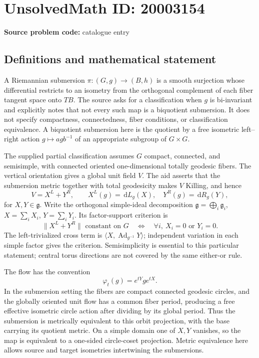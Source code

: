 \documentclass[11pt]{article}
\newcommand{\dd}{\,\mathrm{d}}
\begin{document}
\section*{UnsolvedMath ID: 20003154}
\textbf{Source problem code:} catalogue entry
\subsection{Definitions and mathematical statement}
A Riemannian submersion $\pi:(G,g)\to(B,h)$ is a smooth surjection whose differential restricts to an isometry from the orthogonal complement of each fiber tangent space onto $TB$. The source asks for a classification when $g$ is bi-invariant and explicitly notes that not every such map is a biquotient submersion. It does not specify compactness, connectedness, fiber conditions, or classification equivalence. A biquotient submersion here is the quotient by a free isometric left--right action $g\mapsto agb^{-1}$ of an appropriate subgroup of $G\times G$.

The supplied partial classification assumes $G$ compact, connected, and semisimple, with connected oriented one-dimensional totally geodesic fibers. The vertical orientation gives a global unit field $V$. The aid asserts that the submersion metric together with total geodesicity makes $V$ Killing, and hence
\[
V=X^L+Y^R,\qquad X^L(g)=\dd L_g(X),\quad Y^R(g)=\dd R_g(Y),
\]
for $X,Y\in\mathfrak g$. Write the orthogonal simple-ideal decomposition $\mathfrak g=\bigoplus_i\mathfrak g_i$, $X=\sum_iX_i$, $Y=\sum_iY_i$. Its factor-support criterion is
\[
\|X^L+Y^R\|\text{ constant on }G
\quad\Longleftrightarrow\quad
\forall i,\ X_i=0\text{ or }Y_i=0.
\]
The left-trivialized cross term is $\langle X,\operatorname{Ad}_{g^{-1}}Y\rangle$; independent variation in each simple factor gives the criterion. Semisimplicity is essential to this particular statement; central torus directions are not covered by the same either-or rule.

The flow has the convention
\[
\varphi_t(g)=e^{tY}ge^{tX}.
\]
In the submersion setting the fibers are compact connected geodesic circles, and the globally oriented unit flow has a common fiber period, producing a free effective isometric circle action after dividing by its global period. Thus the submersion is metrically equivalent to this orbit projection, with the base carrying its quotient metric. On a simple domain one of $X,Y$ vanishes, so the map is equivalent to a one-sided circle-coset projection. Metric equivalence here allows source and target isometries intertwining the submersions.
\end{document}

